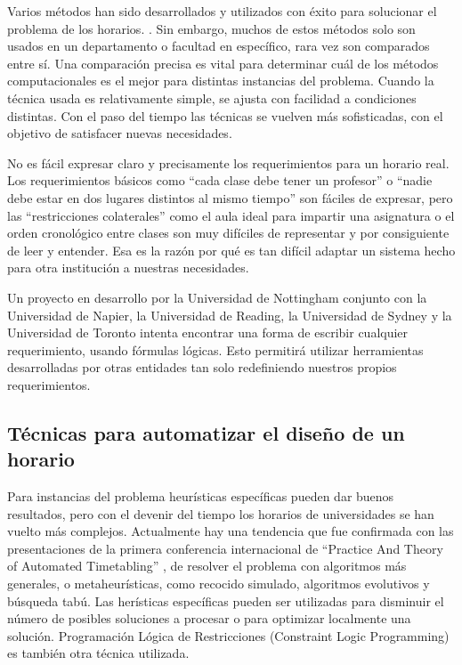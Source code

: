 Varios métodos han sido desarrollados y utilizados con éxito para solucionar el problema de los horarios.
\cite{VA Bardadym, MW Carter, MW Carter and G Laporte, JH Kingston}. Sin embargo, muchos de estos métodos 
solo son usados en un departamento o facultad en específico, rara vez son comparados entre sí. Una 
comparación precisa es vital para determinar cuál de los métodos computacionales es el mejor para
distintas instancias del problema. Cuando la técnica usada es relativamente simple, se ajusta con facilidad
a condiciones distintas. Con el paso del tiempo las técnicas se vuelven más sofisticadas, con el objetivo
de satisfacer nuevas necesidades.

No es fácil expresar claro y precisamente los requerimientos para un horario real. Los requerimientos básicos
como ``cada clase debe tener un profesor'' o ``nadie debe estar en dos lugares distintos al mismo tiempo'' son
fáciles de expresar, pero las ``restricciones colaterales'' como el aula ideal para impartir una asignatura o
el orden cronológico entre clases son muy difíciles de representar y por consiguiente de leer y entender. Esa
es la razón por qué es tan difícil adaptar un sistema hecho para otra institución a nuestras necesidades.

Un proyecto en desarrollo por la Universidad de Nottingham conjunto con la Universidad de Napier, la Universidad
de Reading, la Universidad de Sydney y la Universidad de Toronto intenta encontrar una forma de escribir cualquier
requerimiento, usando fórmulas lógicas. Esto permitirá utilizar herramientas desarrolladas por otras entidades tan
solo redefiniendo nuestros propios requerimientos.

\subsection{Técnicas para automatizar el diseño de un horario}

Para instancias del problema heurísticas específicas pueden dar buenos resultados, pero con el devenir del tiempo
los horarios de universidades se han vuelto más complejos. Actualmente hay una tendencia que fue confirmada
con las presentaciones de la primera conferencia internacional de ``Practice And Theory of Automated Timetabling''
\cite{D Abramson and J Abela}, de resolver el problema con algoritmos más generales, o metaheurísticas, como
recocido simulado, algoritmos evolutivos y búsqueda tabú. Las herísticas específicas pueden ser utilizadas
para disminuir el número de posibles soluciones a procesar o para optimizar localmente una solución. Programación
Lógica de Restricciones (Constraint Logic Programming) es también otra técnica utilizada.

